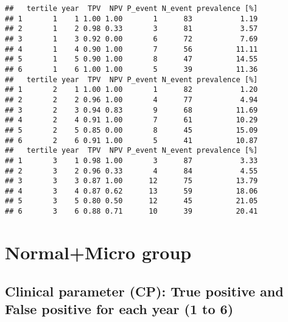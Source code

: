\documentclass[
]{article}
\begin{document}
\begin{verbatim}
##   tertile year  TPV  NPV P_event N_event prevalence [%]
## 1       1    1 1.00 1.00       1      83           1.19
## 2       1    2 0.98 0.33       3      81           3.57
## 3       1    3 0.92 0.00       6      72           7.69
## 4       1    4 0.90 1.00       7      56          11.11
## 5       1    5 0.90 1.00       8      47          14.55
## 6       1    6 1.00 1.00       5      39          11.36
##   tertile year  TPV  NPV P_event N_event prevalence [%]
## 1       2    1 1.00 1.00       1      82           1.20
## 2       2    2 0.96 1.00       4      77           4.94
## 3       2    3 0.94 0.83       9      68          11.69
## 4       2    4 0.91 1.00       7      61          10.29
## 5       2    5 0.85 0.00       8      45          15.09
## 6       2    6 0.91 1.00       5      41          10.87
##   tertile year  TPV  NPV P_event N_event prevalence [%]
## 1       3    1 0.98 1.00       3      87           3.33
## 2       3    2 0.96 0.33       4      84           4.55
## 3       3    3 0.87 1.00      12      75          13.79
## 4       3    4 0.87 0.62      13      59          18.06
## 5       3    5 0.80 0.50      12      45          21.05
## 6       3    6 0.88 0.71      10      39          20.41
\end{verbatim}

\hypertarget{normalmicro-group}{%
\section{Normal+Micro group}\label{normalmicro-group}}

\hypertarget{clinical-parameter-cp-true-positive-and-false-positive-for-each-year-1-to-6-2}{%
\subsection{Clinical parameter (CP): True positive and False positive
for each year (1 to
6)}\label{clinical-parameter-cp-true-positive-and-false-positive-for-each-year-1-to-6-2}}
\end{document}

